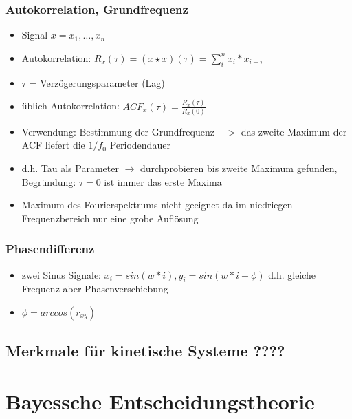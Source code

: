 \documentclass{article} %
\begin{document}
		\subsubsection{Autokorrelation, Grundfrequenz}
		\begin{itemize}
			\item Signal $x = x_1,\dots,x_n$
			\item Autokorrelation: $R_x(\tau) = (x\star x)(\tau) = \sum_{i}^{n} x_i*x_{i-\tau}$
			\item $\tau$ = Verzögerungsparameter (Lag)
			\item üblich Autokorrelation: $ACF_x(\tau) = \frac{R_x(\tau)}{R_x(0)}$
			\item Verwendung: Bestimmung der Grundfrequenz $->$ das zweite Maximum der ACF liefert die $1/f_0$ Periodendauer
			\item d.h. Tau als Parameter $\rightarrow$ durchprobieren bis zweite Maximum gefunden, Begründung: $\tau = 0$ ist immer das erste Maxima
			\item Maximum des Fourierspektrums nicht geeignet da im niedriegen Frequenzbereich nur eine grobe Auflösung
		\end{itemize}
		\subsubsection{Phasendifferenz}
		\begin{itemize}
			\item zwei Sinus Signale: $x_i = sin(w*i), y_i = sin(w*i+\phi)$ d.h. gleiche Frequenz aber Phasenverschiebung
			\item $\phi = arccos(r_{xy})$
		\end{itemize}
	\subsection{Merkmale für kinetische Systeme ????}
\section{Bayessche Entscheidungstheorie}
\end{document}
